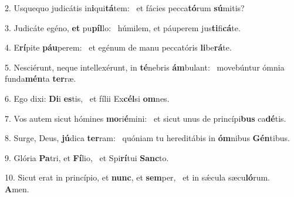 2. Usquequo judicátis in\textbf{i}qui\textbf{tá}tem: \ast\  et fácies pecca\textbf{tó}rum \textbf{sú}mitis?\

3. Judicáte egéno, \textbf{et} pu\textbf{píl}lo: \ast\  húmilem, et páuperem jus\textbf{ti}fi\textbf{cá}te.\

4. E\textbf{rí}pite \textbf{páu}perem: \ast\  et egénum de manu peccatóris \textbf{li}be\textbf{rá}te.\

5. Nesciérunt, neque intellexérunt, in \textbf{té}nebris \textbf{ám}bulant: \ast\  movebúntur ómnia funda\textbf{mén}ta \textbf{ter}ræ.\

6. Ego dixi: \textbf{Di}i \textbf{es}tis, \ast\  et fílii Ex\textbf{cél}si \textbf{om}nes.\

7. Vos autem sicut hómines \textbf{mo}ri\textbf{é}mini: \ast\  et sicut unus de princípi\textbf{bus} ca\textbf{dé}tis.\

8. Surge, Deus, \textbf{jú}dica \textbf{ter}ram: \ast\  quóniam tu hereditábis in \textbf{óm}nibus \textbf{Gén}tibus.\

9. Glória \textbf{Pa}tri, et \textbf{Fí}lio, \ast\  et Spi\textbf{rí}tui \textbf{Sanc}to.\

10. Sicut erat in princípio, et \textbf{nunc}, et \textbf{sem}per, \ast\  et in sǽcula sæcu\textbf{ló}rum. \textbf{A}men.\

